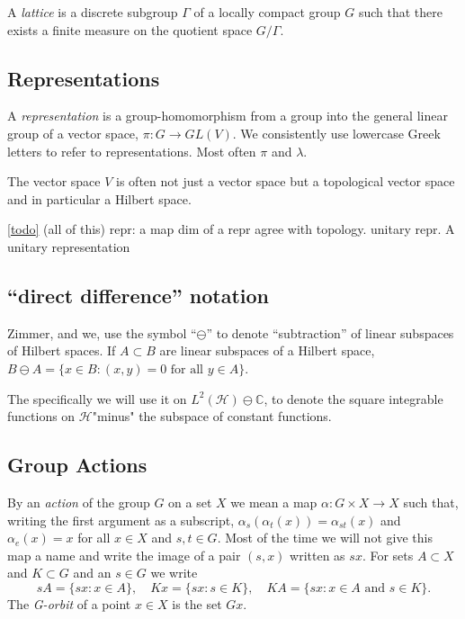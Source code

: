 \documentclass[
]{article}
\theoremstyle{break}
\theoremstyle{plain}
\newcommand{\bbc}{\ensuremath{\mathbb{C}}}
\newcommand{\hilb}{\ensuremath{\mathscr{H}}}
\begin{document}
A \emph{lattice} is a discrete subgroup $\Gamma$ of a locally compact group $G$
such that there exists a finite measure on the quotient space $G/\Gamma$.






\hypertarget{representations}{%
\subsection{Representations}\label{representations}}


A \emph{ representation } is a group-homomorphism from a group into the general linear
group of a vector space, $\pi: G \rightarrow GL(V)$.
We consistently use lowercase Greek letters to refer to representations.
Most often $\pi$ and $\lambda$.

The vector space $V$ is often not just a vector space but a
topological vector space and in particular a Hilbert space.

\href{ergodicity}{{[}todo{]}} (all of this) repr: a map dim of a repr
agree with topology. unitary repr. A unitary representation

\hypertarget{direct-difference-notation}{%
\subsection{``direct difference''
notation}\label{direct-difference-notation}}

Zimmer, and we, use the symbol ``$\ominus$'' to denote ``subtraction''
of linear subspaces of Hilbert spaces. If $A \subset B$ are linear
subspaces of a Hilbert space,
$B \ominus A = \{x \in B: (x,y) = 0 \text{ for all }y \in A\}$.

The specifically we will use it on $L^2(\hilb) \ominus \bbc$, to denote
the square integrable functions on \hilb "minus" the subspace of constant functions.


\hypertarget{group-actions}{
\subsection{Group Actions}\label{group-actions}}

By an \emph{action} of the group $G$ on a set $X$ we mean a
map $\alpha: G \times X \rightarrow X$ such that, writing the first
argument as a subscript, $\alpha_s(\alpha_t(x)) = \alpha_{st}(x)$ and
$\alpha_e(x) = x$ for all $x \in X$ and $s, t \in G$.
Most of the time we will not give this map a name and write the image of a pair
$(s, x)$ written as $sx$. For sets $A \subset X$ and $K \subset G$
and an $s \in G$ we write
$$
s A = \{sx : x \in A\},
\quad
K x = \{sx : s \in K \},
\quad
K A = \{sx : x \in A \text{ and } s \in K \}.
$$
The \emph{G-orbit} of a point $x \in X$ is the set $Gx$.
\end{document}
